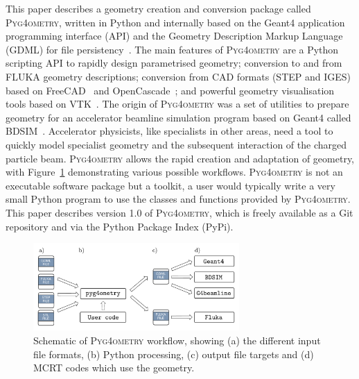\documentclass[preprint,12pt]{elsarticle}
\newcommand{\PYGEOMETRY}{\textsc{Pyg4ometry}}
\begin{document}
This paper describes a geometry creation and conversion package called \PYGEOMETRY{}, written in Python and internally based on the Geant4 application
programming interface (API) and the Geometry Description Markup Language (GDML) for file persistency~\cite{GDML}. The main features of \PYGEOMETRY{}
are a Python scripting API to rapidly design parametrised geometry; conversion to and from  FLUKA geometry descriptions; conversion from CAD formats  (STEP
and IGES) based on FreeCAD~\cite{FreeCAD} and OpenCascade~\cite{OpenCASCADE}; and powerful geometry visualisation tools based on VTK~\cite{VTK4}. The
origin of \PYGEOMETRY{} was a set of utilities to prepare geometry for an accelerator beamline simulation program based on Geant4 called BDSIM~\cite{BDSIM_Nevay}.
Accelerator physicists, like specialists in other areas, need a tool to quickly model specialist geometry and the subsequent interaction of the charged particle beam.
\PYGEOMETRY{} allows the rapid creation and adaptation of geometry, with Figure~\ref{fig:workflow} demonstrating various possible workflows. \PYGEOMETRY{}
is not an executable software package but a toolkit, a user would typically write a very small Python program to use the classes and functions provided by
\PYGEOMETRY{}. This paper describes version 1.0 of \PYGEOMETRY{}, which is freely available as a Git repository and via the Python Package Index (PyPi).

\begin{figure}[hbt!]
  \normalsize
  \centering
  \includegraphics[width=0.7\textwidth]{workflow.pdf}
  \caption{\label{fig:workflow}Schematic of \PYGEOMETRY{} workflow, showing (a) the different input file formats, (b) Python processing, (c) output file targets and
  (d) MCRT codes which use the geometry. }
\end{figure}
\end{document}
